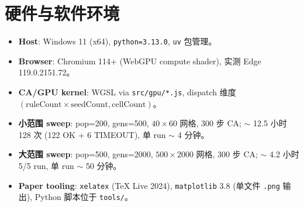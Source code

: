 \section{硬件与软件环境}
\label{sec:appendix-c}

\begin{itemize}[leftmargin=*, itemsep=2pt]
  \item \textbf{Host}: Windows 11 (x64), \texttt{python=3.13.0}, \texttt{uv} 包管理。
  \item \textbf{Browser}: Chromium 114+ (WebGPU compute shader), 实测 Edge 119.0.2151.72。
  \item \textbf{CA/GPU kernel}: WGSL via \texttt{src/gpu/*.js}, dispatch 维度 $(\text{ruleCount} \times \text{seedCount}, \text{cellCount})$。
  \item \textbf{小范围 sweep}: pop=200, gens=500, $40 \times 60$ 网格, 300 步 CA; $\sim$ 12.5 小时 128 次 (122 OK + 6 TIMEOUT), 单 run $\sim$ 4 分钟。
  \item \textbf{大范围 sweep}: pop=500, gens=2000, $500 \times 2000$ 网格, 300 步 CA; $\sim$ 4.2 小时 5/5 run, 单 run $\sim$ 50 分钟。
  \item \textbf{Paper tooling}: \texttt{xelatex} (TeX Live 2024), \texttt{matplotlib} 3.8 (单文件 \texttt{.png} 输出), Python 脚本位于 \texttt{tools/}。
\end{itemize}

